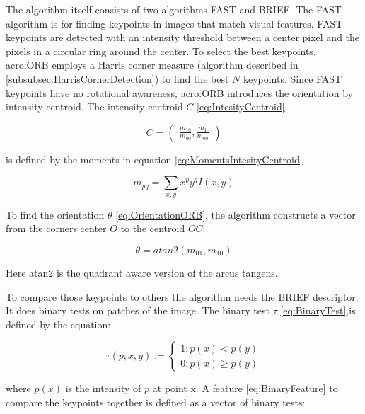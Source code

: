 The algorithm itself consists of two algorithms FAST and BRIEF. The FAST algorithm is for finding keypoints in images that match visual features. FAST keypoints are detected with an intensity threshold between a center pixel and the pixels in a circular ring around the center. To select the best keypoints, \acrshort{acro:ORB} employs a Harris corner measure (algorithm described in \ref{subsubsec:HarrisCornerDetection}) to find the best $N$ keypoints. Since FAST keypoints have no rotational awareness, \acrshort{acro:ORB} introduces the orientation by intensity centroid. The intensity centroid $C$ \eqref{eq:IntesityCentroid}

\begin{equation}\label{eq:IntesityCentroid} C = \begin{pmatrix}
\frac{m_{10}}{m_{00}},\frac{m_{1}}{m_{00}}\end{pmatrix} \end{equation}

is defined by the moments in equation \eqref{eq:MomentsIntesityCentroid}

\begin{equation}\label{eq:MomentsIntesityCentroid} m_{pq} = \sum_{x,y} x^p y^q I(x,y)\end{equation}

To find the orientation $\theta$ \eqref{eq:OrientationORB}, the algorithm constructs a vector from the corners center $O$ to the centroid $OC$.

\begin{equation}\label{eq:OrientationORB} \theta = atan2(m_{01},m_10)\end{equation}

Here atan2 is the quadrant aware version of the arcus tangens.

To compare those keypoints to others the algorithm needs the BRIEF descriptor. It does binary tests on patches of the image. The binary test $\tau$ \eqref{eq:BinaryTest},is defined by the equation:

\begin{equation}\label{eq:BinaryTest} \tau(p;x,y) := \begin{cases} 1 :p(x) < p(y) \\ 0 :p(x) \geq p(y)\end{cases}\end{equation}

where $p(x)$ is the intensity of $p$ at point x. A feature \eqref{eq:BinaryFeature} to compare the keypoints together is defined as a vector of binary tests: 


